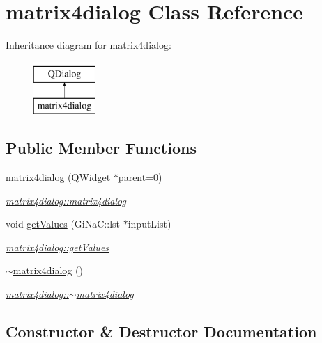 \hypertarget{classmatrix4dialog}{}\section{matrix4dialog Class Reference}
\label{classmatrix4dialog}
Inheritance diagram for matrix4dialog\+:\begin{figure}[H]
\begin{center}
\leavevmode
\includegraphics[height=2.000000cm]{classmatrix4dialog}
\end{center}
\end{figure}
\subsection*{Public Member Functions}
\begin{DoxyCompactItemize}
\item 
\mbox{\hyperlink{classmatrix4dialog_a5f97315156e47939f8811cce88d8e580}{matrix4dialog}} (Q\+Widget $\ast$parent=0)
\begin{DoxyCompactList}\small\item\em \mbox{\hyperlink{classmatrix4dialog_a5f97315156e47939f8811cce88d8e580}{matrix4dialog\+::matrix4dialog}} \end{DoxyCompactList}\item 
void \mbox{\hyperlink{classmatrix4dialog_a4826be428cb3f2d79905aee086cc296d}{get\+Values}} (Gi\+Na\+C\+::lst $\ast$input\+List)
\begin{DoxyCompactList}\small\item\em \mbox{\hyperlink{classmatrix4dialog_a4826be428cb3f2d79905aee086cc296d}{matrix4dialog\+::get\+Values}} \end{DoxyCompactList}\item 
\mbox{\hyperlink{classmatrix4dialog_aebc069268fc2120b95dc75338b03cb68}{$\sim$matrix4dialog}} ()
\begin{DoxyCompactList}\small\item\em \mbox{\hyperlink{classmatrix4dialog_aebc069268fc2120b95dc75338b03cb68}{matrix4dialog\+::$\sim$matrix4dialog}} \end{DoxyCompactList}\end{DoxyCompactItemize}


\subsection{Constructor \& Destructor Documentation}
\mbox{\label{classmatrix4dialog_a5f97315156e47939f8811cce88d8e580}} 
